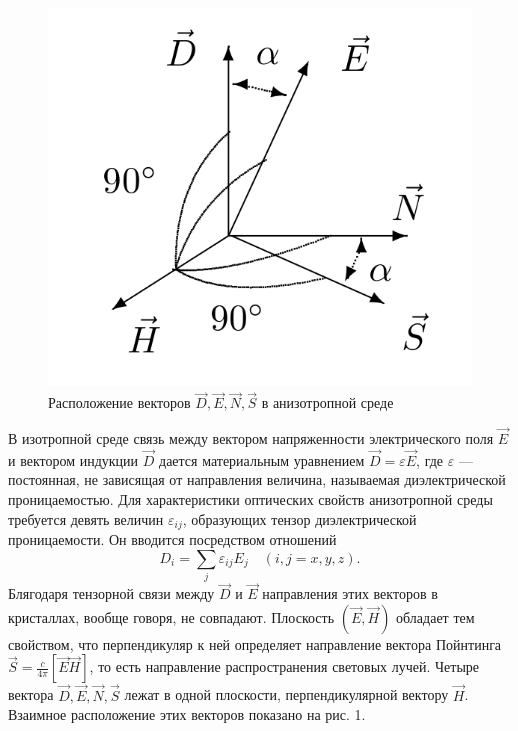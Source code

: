 \documentclass[10pt, a4paper]{article}
\begin{document}
\begin{figure}
    \centering
    \includegraphics[width=1\textwidth]{DENS.png}
    \caption{Расположение векторов $\vec D, \vec E, \vec N, \vec S$ в анизотропной среде}
\end{figure} 
 
 
 В изотропной среде связь между вектором напряженности электрического поля $\vec E$ и вектором индукции $\vec D$ дается материальным уравнением $\vec D = \varepsilon \vec E$, где $\varepsilon$ --- постоянная, не зависящая от направления величина, называемая диэлектрической проницаемостью. Для характеристики оптических свойств анизотропной среды требуется девять величин $\varepsilon_{i j}$, образующих тензор диэлектрической проницаемости. Он вводится посредством отношений
 \begin{equation}
 	D_i = \sum_j \varepsilon_{i j} E_j \quad (i, j = x, y, z).
 \end{equation}
 Блягодаря тензорной связи между $\vec D$ и $\vec E$ направления этих векторов в кристаллах, вообще говоря, не совпадают. Плоскость $\left( \vec E, \vec H \right)$ обладает тем свойством, что перпендикуляр к ней определяет направление вектора Пойнтинга $\vec S = \frac{c}{4 \pi} \left[\vec E \vec H \right]$, то есть направление распространения световых лучей. Четыре вектора $\vec D, \vec E, \vec N, \vec S$ лежат в одной плоскости, перпендикулярной вектору $\vec H$. Взаимное расположение этих векторов показано на рис. 1.
\end{document}
